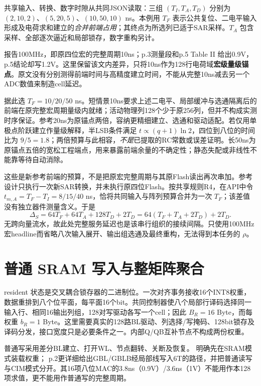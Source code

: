 共享输入、转换、数字时隙从共同JSON读取：三组 $(T_I,T_A,T_D)$ 分别为 $(2,10,2)$、$(5,20,5)$、$(10,50,10)$ ns。本例用 $T_F$ 表示公共复位、二电平输入形成及电荷求和建立的\emph{合并前端占用}；其终点为所选列已适于SAR采样。$T_A$ 包含采样、全部逐次逼近和局部锁存，数字重构另计。

 报告100MHz，即原四位宏的完整周期10ns；p.3测量段和p.5 Table II 给出0.9V，p.5结论却写1.2V。这里保留该文内差异，只将10ns作为128行电荷域\textbf{宏级量级锚点}。原文没有分别测得前端时间与高精度建立时间，不能从完整10ns减去另一个ADC数值来制造cell延迟。

据此选 $T_F=10/20/50$ ns。短情景10ns要求上述二电平、局部缓冲与选通隔离后的前端在原完整宏周期量级内就绪；活动物理列128个少于原256列，但并不构成实测时序保证。参考20ns为原锚点两倍，容纳更精细建立、选通和驱动适配。若仅用单极点阶跃建立作量级解释，半LSB条件满足 $t\propto(q+1)\ln2$，四位到八位的时间比为 $9/5=1.8$；两倍预算与此相容，\emph{不是}已提取的RC常数或误差证明。长50ns为原锚点五倍的宽松工程端点，用来暴露前端余量的不确定性；静态失配或非线性不能靠等待自动消除。

这些是新参考前端的预算，不是把原宏完整周期与其原Flash读出再次串加。参考设计只执行一次新SAR转换，并未执行原四位Flash。按共享规则R4，在API中令 $t_{m,A}=T_F-T_I=8/15/40$ ns，恰将共同输入与阵列预算合并为一次 $T_F$；该差值没有独立器件测量含义。于是
\begin{equation}
\Delta_S=64T_F+64T_A+128T_D+2T_D
       =64(T_F+T_A+2T_D)+2T_D.
\label{01_sram_acim:eq:ds}
\end{equation}
无跨向量流水，故此处完整服务延迟也是该串行组织的接续间隔。只使用100MHz宏headline而省略八次输入展开、输出组选通及最终重构，无法得到本任务的 $\rho$。

\section{普通 SRAM 写入与整矩阵聚合}

resident 状态是交叉耦合锁存器的二进制位。一次对齐事务接收16个INT8权重，数据重排到八个位平面，每平面16个bit。共同控制器使八个局部行译码选择同一输入行、相同16输出列组，128对写驱动各写一个cell；因此 $B_R=16$ Byte，而每权重 $b_R=1$ Byte。这里需要真实的128路BL驱动、列选择/写掩码、128bit锁存及译码分发，接口宽度只是必要条件之一。内部Q/QB互补节点不构成两份权重。

普通写采用差分BL建立、打开WL、节点翻转、关断及恢复。 明确先在SRAM模式装载权重； p.2更详细给出GBL/GBLB经局部线写入6T的路径，并把普通读写与CIM模式分开。其16项八位MAC的3.8ns（0.9V）/3.6ns（1V）不能用作本128项求值，更不能用作普通写的完整周期。

